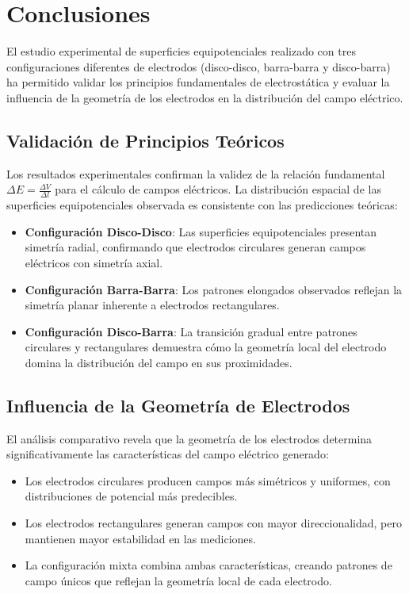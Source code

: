\documentclass[11pt,twocolumn]{article}
\begin{document}
\section{Conclusiones}

El estudio experimental de superficies equipotenciales realizado con tres configuraciones diferentes de electrodos (disco-disco, barra-barra y disco-barra) ha permitido validar los principios fundamentales de electrostática y evaluar la influencia de la geometría de los electrodos en la distribución del campo eléctrico.

\subsection{Validación de Principios Teóricos}

Los resultados experimentales confirman la validez de la relación fundamental $\Delta E = \frac{\Delta V}{\Delta l}$ para el cálculo de campos eléctricos. La distribución espacial de las superficies equipotenciales observada es consistente con las predicciones teóricas:

\begin{itemize}
\item \textbf{Configuración Disco-Disco}: Las superficies equipotenciales presentan simetría radial, confirmando que electrodos circulares generan campos eléctricos con simetría axial.
\item \textbf{Configuración Barra-Barra}: Los patrones elongados observados reflejan la simetría planar inherente a electrodos rectangulares.
\item \textbf{Configuración Disco-Barra}: La transición gradual entre patrones circulares y rectangulares demuestra cómo la geometría local del electrodo domina la distribución del campo en sus proximidades.
\end{itemize}

\subsection{Influencia de la Geometría de Electrodos}

El análisis comparativo revela que la geometría de los electrodos determina significativamente las características del campo eléctrico generado:

\begin{itemize}
\item Los electrodos circulares producen campos más simétricos y uniformes, con distribuciones de potencial más predecibles.
\item Los electrodos rectangulares generan campos con mayor direccionalidad, pero mantienen mayor estabilidad en las mediciones.
\item La configuración mixta combina ambas características, creando patrones de campo únicos que reflejan la geometría local de cada electrodo.
\end{itemize}
\end{document}
